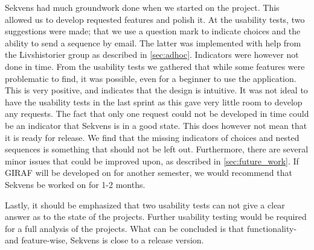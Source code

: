 Sekvens had much groundwork done when we started on the project. This allowed us to develop requested features and polish it. At the usability tests, two suggestions were made; that we use a question mark to indicate choices and the ability to send a sequence by email. The latter was implemented with help from the Livshistorier group as described in \ref{sec:adhoc}. Indicators were however not done in time.
From the usability tests we gathered that while some features were problematic to find, it was possible, even for a beginner to use the application. This is very positive, and indicates that the design is intuitive.
It was not ideal to have the usability tests in the last sprint as this gave very little room to develop any requests. The fact that only one request could not be developed in time could be an indicator that Sekvens is in a good state. This does however not mean that it is ready for release. We find that the missing indicators of choices and nested sequences is something that should not be left out. Furthermore, there are several minor issues that could be improved upon, as described in \ref{sec:future_work}. If GIRAF will be developed on for another semester, we would recommend that Sekvens be worked on for 1-2 months.

Lastly, it should be emphasized that two usability tests can not give a clear answer as to the state of the projects. Further usability testing would be required for a full analysis of the projects. What can be concluded is that functionality- and feature-wise, Sekvens is close to a release version.